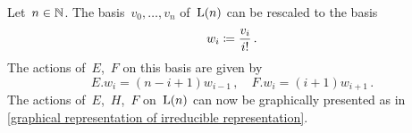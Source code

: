 \documentclass[a4paper, 11pt, oneside]{scrartcl}
\begin{document}
\begin{remark}
  Let~$n \in \mathbb{N}$.
  The basis~$v_0, \dotsc, v_n$ of~$\operatorname{L}(n)$ can be rescaled to the basis
  \[
    w_i
    \coloneqq
    \frac{v_i}{i!} \,.
  \]
  The actions of~$E$,~$F$ on this basis are given by
  \[
    E.w_i = (n-i+1) w_{i-1} \,,
    \quad
    F.w_i = (i+1) w_{i+1} \,.
  \]
  The actions of~$E$,~$H$,~$F$ on~$\operatorname{L}(n)$ can now be graphically presented as in \cref{graphical representation of irreducible representation}.
\end{remark}
\end{document}
